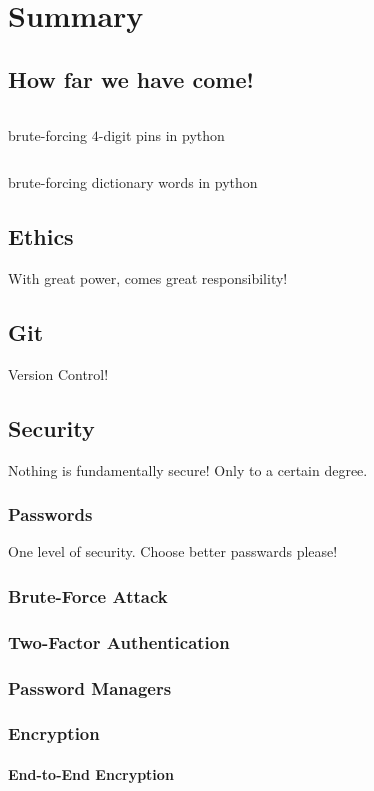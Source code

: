 \chapter{Summary}
\section{How far we have come!}
\begin{code}
	\inputminted{python}{codes/src8/pin.py}
	\caption{brute-forcing $4$-digit pins in python}
\end{code}
\begin{code}
	\inputminted{python}{codes/src8/password.py}
	\caption{brute-forcing dictionary words in python}
\end{code}

\section{Ethics}
With great power, comes great responsibility!

\section{Git}
Version Control!

\section{Security}
Nothing is fundamentally secure! Only to a certain degree.
\subsection{Passwords}
One level of security. Choose better passwards please!
\subsection{Brute-Force Attack}
\subsection{Two-Factor Authentication}
\subsection{Password Managers}
\subsection{Encryption}
\subsubsection{End-to-End Encryption}

